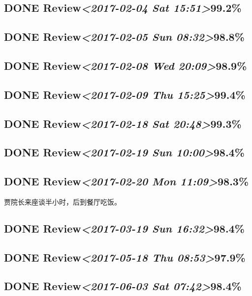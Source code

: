 \documentclass[11pt]{ctexart}
\begin{document}
\subsection{{\bfseries\sffamily DONE} Review\textit{<2017-02-04 Sat 15:51>}99.2\%}
\label{sec:orgccc099f}
\subsection{{\bfseries\sffamily DONE} Review\textit{<2017-02-05 Sun 08:32>}98.8\%}
\label{sec:org14e690d}
\subsection{{\bfseries\sffamily DONE} Review\textit{<2017-02-08 Wed 20:09>}98.9\%}
\label{sec:orgf9b921c}
\subsection{{\bfseries\sffamily DONE} Review\textit{<2017-02-09 Thu 15:25>}99.4\%}
\label{sec:org1813549}
\subsection{{\bfseries\sffamily DONE} Review\textit{<2017-02-18 Sat 20:48>}99.3\%}
\label{sec:org742d8c8}
\subsection{{\bfseries\sffamily DONE} Review\textit{<2017-02-19 Sun 10:00>}98.4\%}
\label{sec:orgbd04f8b}
\subsection{{\bfseries\sffamily DONE} Review\textit{<2017-02-20 Mon 11:09>}98.3\%}
\label{sec:org91c65c2}
贾院长来座谈半小时，后到餐厅吃饭。
\subsection{{\bfseries\sffamily DONE} Review\textit{<2017-03-19 Sun 16:32>}98.4\%}
\label{sec:orgb012a60}
\subsection{{\bfseries\sffamily DONE} Review\textit{<2017-05-18 Thu 08:53>}97.9\%}
\label{sec:org415a417}
\subsection{{\bfseries\sffamily DONE} Review\textit{<2017-06-03 Sat 07:42>}98.4\%}
\label{sec:org5298ac9}
\end{document}
